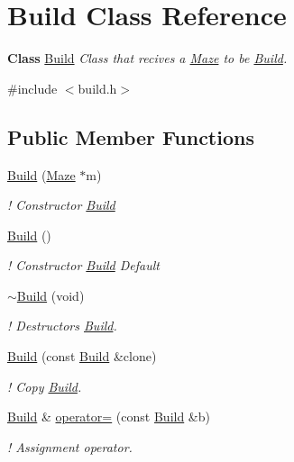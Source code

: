 \hypertarget{classBuild}{}\section{Build Class Reference}
\label{classBuild}


{\bfseries Class} \hyperlink{classBuild}{Build} {\itshape Class that recives a \hyperlink{classMaze}{Maze} to be \hyperlink{classBuild}{Build}.}  




{\ttfamily \#include $<$build.\+h$>$}

\subsection*{Public Member Functions}
\begin{DoxyCompactItemize}
\item 
\hyperlink{classBuild_a1b8365d07d8ab0c0d107fbc30ee6eb1c}{Build} (\hyperlink{classMaze}{Maze} $\ast$m)
\begin{DoxyCompactList}\small\item\em ! Constructor \hyperlink{classBuild}{Build} \end{DoxyCompactList}\item 
\hyperlink{classBuild_a96ad56fb129cfbc2131fd094c41ae1ec}{Build} ()
\begin{DoxyCompactList}\small\item\em ! Constructor \hyperlink{classBuild}{Build} Default \end{DoxyCompactList}\item 
\hyperlink{classBuild_a7fc2f29804f9dc29b640838b515841e8}{$\sim$\+Build} (void)
\begin{DoxyCompactList}\small\item\em ! Destructors \hyperlink{classBuild}{Build}. \end{DoxyCompactList}\item 
\hyperlink{classBuild_aeadb5e6bafcfb4e7811bbd434ac5c663}{Build} (const \hyperlink{classBuild}{Build} \&clone)
\begin{DoxyCompactList}\small\item\em ! Copy \hyperlink{classBuild}{Build}. \end{DoxyCompactList}\item 
\hyperlink{classBuild}{Build} \& \hyperlink{classBuild_a72dbb04928303d0b90d003cb90d85550}{operator=} (const \hyperlink{classBuild}{Build} \&b)
\begin{DoxyCompactList}\small\item\em ! Assignment operator. \end{DoxyCompactList}\item 

\end{DoxyCompactItemize}
